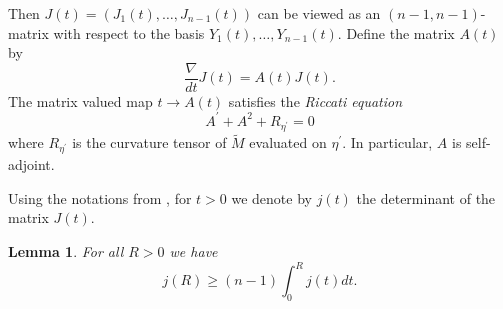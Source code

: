 \documentclass[11pt]{amsart}
\theoremstyle{plain}
\theoremstyle{plain}
\newtheorem{lemma}[theorem]{Lemma}
\theoremstyle{definition}
\begin{document}
Then $J(t)=(J_1(t),\dots,J_{n-1}(t))$ can be viewed as an 
$(n-1,n-1)$-matrix with respect to the basis $Y_1(t),\dots,Y_{n-1}(t)$.  
Define the matrix $A(t)$ by 
\begin{equation}\label{riccati}
\frac{\nabla}{dt}J(t)=A(t)J(t).\end{equation}
The matrix valued map $t\to A(t)$ satisfies the \emph{Riccati equation}
\[A^\prime +A^2+R_{\eta^\prime}=0\]
where $R_{\eta^\prime}$ is the curvature tensor of $\tilde M$ 
evaluated on $\eta^\prime$. In particular,
$A$ is self-adjoint. 




Using the notations from \cite{E94}, 
for $t>0$ we denote by $j(t)$ the determinant of the matrix $J(t)$. 


\begin{lemma}\label{volumegrowth}
For all $R>0$ we have 
\[j(R)\geq (n-1)\int_0^Rj(t)dt.\]
\end{lemma}
\end{document}
